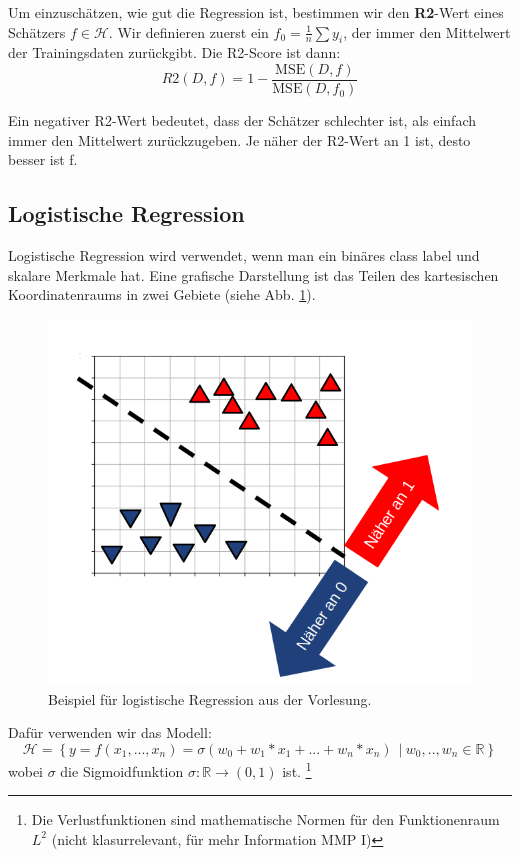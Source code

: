 Um einzuschätzen, wie gut die Regression ist, bestimmen wir den \textbf{R2}-Wert eines Schätzers $f \in \mathcal{H}$. Wir definieren zuerst ein $f_0 = \frac{1}{n}\sum y_i$, der immer den Mittelwert der Trainingsdaten zurückgibt. Die R2-Score ist dann:
\begin{equation}
    R2(D,f) = 1 - \frac{\mathrm{MSE}(D,f)}{\mathrm{MSE}(D,f_0)}
\end{equation}


Ein negativer R2-Wert bedeutet, dass der Schätzer schlechter ist, als einfach immer den Mittelwert zurückzugeben. Je näher der R2-Wert an 1 ist, desto besser ist f. 

\subsection{Logistische Regression}
Logistische Regression wird verwendet, wenn man ein binäres class label und skalare Merkmale hat. Eine grafische Darstellung ist das Teilen des kartesischen Koordinatenraums in zwei Gebiete (siehe Abb. \ref{fig:ml-div}).

\begin{figure}[h]
    \centering
    \includegraphics[scale=0.27]{Figures/ML-divided space.png}
    \caption{Beispiel für logistische Regression aus der Vorlesung.}
    \label{fig:ml-div}
\end{figure}

Dafür verwenden wir das Modell:
\begin{equation}
        \mathcal{H} = \left\{ y=f(x_1,...,x_n) = \sigma (w_0 + w_1*x_1 + ... + w_n*x_n) ~~|~w_0,..,w_n \in \mathbb{R}\right\}
\end{equation}
wobei  $\sigma$ die Sigmoidfunktion $\sigma: \mathbb{R} \to (0,1)$ ist. \footnote{Die Verlustfunktionen sind mathematische Normen für den Funktionenraum $L^2$ (nicht klasurrelevant, für mehr Information MMP I)}

